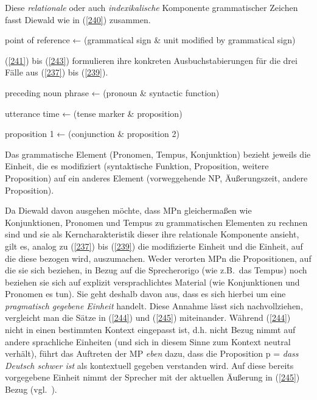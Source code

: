 Diese \textit{relationale} oder auch \textit{indexikalische} Komponente grammatischer Zeichen fasst Diewald wie in (\ref{240}) zusammen.

\begin{exe}
	\ex\label{240} 
	point of reference ← (grammatical sign \& unit modified by grammatical sign)
	\hfill\hbox{\citet[415]{Diewald2006}}
\end{exe}
(\ref{241}) bis (\ref{243}) formulieren ihre konkreten Ausbuchstabierungen für die drei Fälle aus (\ref{237}) bis (\ref{239}). 
	
\begin{exe}
	\ex\label{241} 
	preceding noun phrase ← (pronoun \& syntactic function)
\end{exe}	
\begin{exe}
	\ex\label{242} 
	utterance time ← (tense marker \& proposition)
\end{exe}		
		
\begin{exe}
	\ex\label{243} 
	proposition 1 ← (conjunction \& proposition 2)
	\hfill\hbox{\citet[415]{Diewald2006}}
\end{exe}															
Das grammatische Element (Pronomen, Tempus, Konjunktion) bezieht jeweils die Einheit, die es modifiziert (syntaktische Funktion, Proposition, weitere Proposition) auf ein anderes Element (vorweggehende NP, Äußerungszeit, andere Pro\-position).

Da Diewald davon ausgehen möchte, dass MPn gleichermaßen wie Konjunktionen, Pronomen und Tempus zu grammatischen Elementen zu rechnen sind und sie als Kerncharakteristik dieser ihre relationale Komponente ansieht, gilt es, analog zu (\ref{237}) bis (\ref{239}) die modifizierte Einheit und die Einheit, auf die diese bezogen wird, auszumachen. Weder verorten MPn die Propositionen, auf die sie sich beziehen, in Bezug auf die Sprecherorigo (wie z.B.\ das Tempus) noch beziehen sie sich auf explizit versprachlichtes Material (wie Konjunktionen und Pronomen es tun). Sie geht deshalb davon aus, dass es sich hierbei um eine \textit{pragmatisch gegebene Einheit} handelt. Diese Annahme lässt sich nachvollziehen, vergleicht man die Sätze in (\ref{244}) und (\ref{245}) miteinander. Während (\ref{244}) nicht in einen bestimmten Kontext eingepasst ist, d.h. nicht Bezug nimmt auf andere sprachliche Einheiten (und sich in diesem Sinne zum Kontext neutral verhält), führt das Auftreten der MP \textit{eben} dazu, dass die Proposition p = \textit{dass Deutsch schwer ist} als kontextuell gegeben verstanden wird. Auf diese bereits vorgegebene Einheit nimmt der Sprecher mit der aktuellen Äußerung in (\ref{245}) Bezug (vgl.\ \citealt[416]{Diewald2006}).

